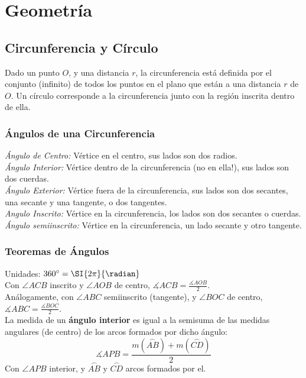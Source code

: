 \pagebreak
\section{Geometría}
\def\svgwidth{\columnwidth}
\subsection{Circunferencia y Círculo}
Dado un punto $O$, y una distancia $r$, la circunferencia está definida por el conjunto (infinito) de todos los puntos en el plano que están a una distancia $r$ de $O$. Un círculo corresponde a la circunferencia junto con la región inscrita dentro de ella.\\

\subsubsection{Ángulos de una Circunferencia}
\textit{Ángulo de Centro:} Vértice en el centro, sus lados son dos radios.\\
\textit{Ángulo Interior:} Vértice dentro de la circunferencia (no en ella!), sus lados son dos cuerdas.\\
\textit{Ángulo Exterior:} Vértice fuera de la circunferencia, sus lados son dos secantes, una secante y una tangente, o dos tangentes.\\
\textit{Angulo Inscrito:} Vértice en la circunferencia, los lados son dos secantes o cuerdas.\\
\textit{Ángulo semiinscrito:} Vértice en la circunferencia, un lado secante y otro tangente.\\

\subsubsection{Teoremas de Ángulos}
Unidades: $360^{\circ} = \SI{2\pi}{\radian}$\\

Con $\angle ACB$ inscrito y $\angle AOB$ de centro,
$\measuredangle ACB = \frac{\measuredangle AOB}{2}$.\\

Análogamente, con $\angle ABC$ semiinscrito (tangente), y $\angle BOC$ de centro, $\measuredangle ABC = \frac{\measuredangle BOC}{2}$.\\

La medida de un \textbf{ángulo interior} es igual a la semisuma de las medidas angulares (de centro) de los arcos formados por dicho ángulo:
\begin{equation*}
    \measuredangle APB = \frac{m(\stackrel\frown{AB}) + m(\stackrel\frown{CD})}{2}
\end{equation*}
Con $\angle APB$ interior, y $\stackrel\frown{AB}$ y $\stackrel\frown{CD}$ arcos formados por el.\\

